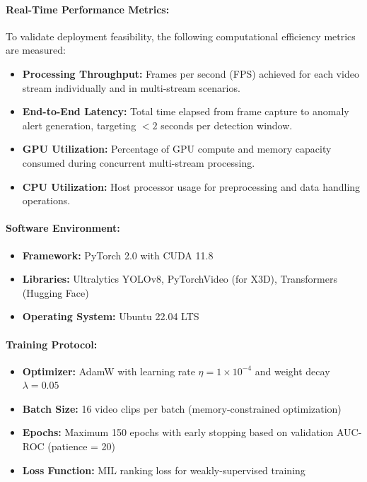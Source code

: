 \documentclass[12pt]{article}
\begin{document}
\paragraph{Real-Time Performance Metrics:}
To validate deployment feasibility, the following computational efficiency metrics are measured:

\begin{itemize}
    \item \textbf{Processing Throughput:} Frames per second (FPS) achieved for each video stream individually and in multi-stream scenarios.
    \item \textbf{End-to-End Latency:} Total time elapsed from frame capture to anomaly alert generation, targeting $< 2$ seconds per detection window.
    \item \textbf{GPU Utilization:} Percentage of GPU compute and memory capacity consumed during concurrent multi-stream processing.
    \item \textbf{CPU Utilization:} Host processor usage for preprocessing and data handling operations.
\end{itemize}


\paragraph{Software Environment:}
\begin{itemize}
    \item \textbf{Framework:} PyTorch 2.0 with CUDA 11.8
    \item \textbf{Libraries:} Ultralytics YOLOv8, PyTorchVideo (for X3D), Transformers (Hugging Face)
    \item \textbf{Operating System:} Ubuntu 22.04 LTS
\end{itemize}

\paragraph{Training Protocol:}
\begin{itemize}
    \item \textbf{Optimizer:} AdamW with learning rate $\eta = 1 \times 10^{-4}$ and weight decay $\lambda = 0.05$
    \item \textbf{Batch Size:} 16 video clips per batch (memory-constrained optimization)
    \item \textbf{Epochs:} Maximum 150 epochs with early stopping based on validation AUC-ROC (patience = 20)
    \item \textbf{Loss Function:} MIL ranking loss for weakly-supervised training
\end{itemize}
\end{document}
